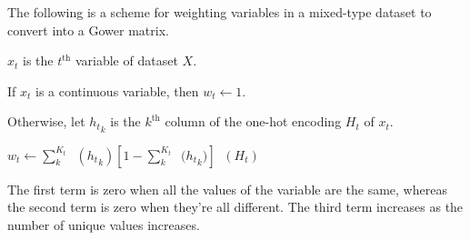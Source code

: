 \documentclass[8pt]{article}
\DeclareMathOperator{\Var}{\widehat{Var}}
\DeclareMathOperator{\Kurt}{\widehat{Kurt}}
\begin{document}
    The following is a scheme for weighting variables in a mixed-type dataset to convert into a Gower
    matrix.

    $x_t$ is the $t^{\text{th}}$ variable of dataset $X$.

    If $x_t$ is a continuous variable, then $w_t\leftarrow1$.

    Otherwise, let ${h_t}_k$ is the $k^{\text{th}}$ column of the one-hot encoding $H_t$ of $x_t$.

    $w_t\leftarrow\sum_k^{K_t}{\Var({h_t}_k)}\left[1-\sum_k^{K_t}{\Var({h_t}_k})\right]\Kurt(H_t)$

    The first term is zero when all the values of the variable are the same, whereas the second term is zero when
    they're all different. The third term increases as the number of unique values increases.
\end{document}
